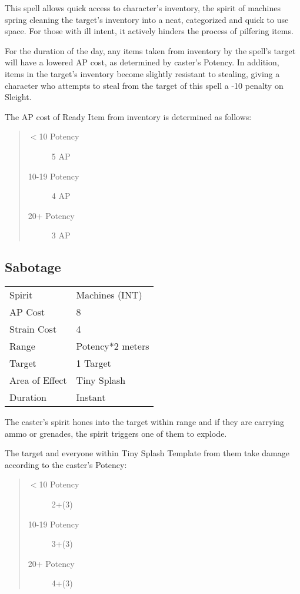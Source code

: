 \documentclass[11pt,a4paper,twocolumn]{book}
\begin{document}
\medskip

This spell allows quick access to character's inventory, the spirit of machines spring cleaning the target's inventory into a neat, categorized and quick to use space. For those with ill intent, it actively hinders the process of pilfering items. 

For the duration of the day, any items taken from inventory by the spell's target will have a lowered AP cost, as determined by caster's Potency. In addition, items in the target's inventory become slightly resistant to stealing, giving a character who attempts to steal from the target of this spell a -10 penalty on Sleight.

The AP cost of Ready Item from inventory is determined as follows:
\begin{quote}
	\begin{description}
		\item[$<$10 Potency] 	5 AP
		\item[10-19 Potency] 	4 AP
		\item[20+ Potency]  	3 AP
	\end{description}	
\end{quote}

\subsection*{Sabotage}
{
	\begin{tabu} to 75mm{| X[l,4] | X[l,7] |}
		\hline
		Spirit 			&  Machines (INT)			\\
		AP Cost	      	&  8					\\
		Strain Cost     &  4					\\
		Range     		&  Potency*2 meters		\\
		Target      	&  1 Target				\\
		Area of Effect  &  Tiny Splash	 				\\
		Duration     	&  Instant				\\ \hline
	\end{tabu}
	
}

\medskip

The caster's spirit hones into the target within range and if they are carrying ammo or grenades, the spirit triggers one of them to explode. 

The target and everyone within Tiny Splash Template from them take damage according to the caster's Potency:
\begin{quote}
	\begin{description}
		\item[$<$10 Potency] 	2+(3)
		\item[10-19 Potency] 	3+(3)
		\item[20+ Potency] 	    4+(3)
	\end{description}
\end{quote}
\end{document}
